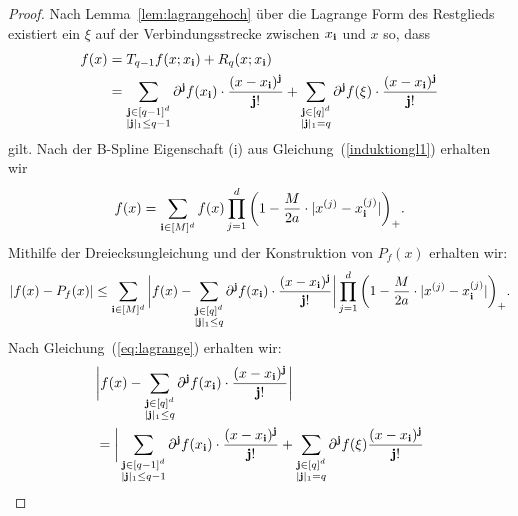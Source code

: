\begin{proof}
Nach Lemma~\ref{lem:lagrangehoch} über die Lagrange Form des Restglieds existiert ein $\xi$ auf der Verbindungsstrecke zwischen $x_{\mathbf{i}}$ und $x$ so, dass 
\begin{equation}
\label{eq:lagrange}
\begin{split}
f(x) & = T_{q - 1}f(x; x_{\mathbf{i}}) + R_q(x; x_{\mathbf{i}})\\
& = \sum_{\substack{\mathbf{j} \in [q - 1]^d \\ |\mathbf{j}|_1 \leq q - 1}}  \partial^{\mathbf{j}}f(x_{\mathbf{i}}) \cdot \frac{ (x - x_{\mathbf{i}})^{\mathbf{j}} }{\mathbf{j}!} + \sum_{\substack{ \mathbf{j} \in [q]^d \\|\mathbf{j}|_1 = q}} \partial^{\mathbf{j}}f(\xi) \cdot \frac{ (x - x_{\mathbf{i}})^{\mathbf{j}} }{\mathbf{j}!}
\end{split}
\end{equation}
gilt.
Nach der B-Spline Eigenschaft (i) aus Gleichung~(\ref{induktiongl1}) erhalten wir 
$$f(x) = \sum_{\mathbf{i} \in [M]^d} f(x) \prod_{j = 1}^d \bigg(1 - \frac{M}{2a} \cdot |x^{(j)} - x_{\mathbf{i}}^{(j)}|\bigg)_+.$$ 
Mithilfe der Dreiecksungleichung und der Konstruktion von $P_f(x)$ erhalten wir:
\begin{equation}
\label{eq:drei}
\begin{split}
|f(x) - P_f(x)| \leq \sum_{\mathbf{i} \in [M]^d} \bigg|f(x) - \sum_{\substack{\mathbf{j} \in [q]^d \\|\mathbf{j}|_1 \leq q}} \partial^{\mathbf{j}}f(x_{\mathbf{i}}) \cdot \frac{(x - x_{\mathbf{i}})^{\mathbf{j}}}{\mathbf{j}!}\bigg| \prod_{j = 1}^d \bigg(1 - \frac{M}{2a} \cdot |x^{(j)} - x_{\mathbf{i}}^{(j)}|\bigg)_+.
\end{split}
\end{equation}
Nach Gleichung~(\ref{eq:lagrange}) erhalten wir:
\begin{equation}
\label{eq:sum}
\begin{split}
& \bigg|f(x) - \sum_{\substack{\mathbf{j} \in [q]^d \\|\mathbf{j}|_1 \leq q}} \partial^{\mathbf{j}}f(x_{\mathbf{i}}) \cdot \frac{(x - x_{\mathbf{i}})^{\mathbf{j}}}{\mathbf{j}!}\bigg| \\ 
& = \bigg| \sum_{\substack{\bj \in [q - 1]^d \\ |\bj|_1 \leq q - 1}}  \partial^{\bj}f(x_{\mathbf{i}}) \cdot \frac{ (x - x_{\mathbf{i}})^{\bj} }{\bj!} + \sum_{\substack{ \bj \in [q]^d \\|\bj|_1 = q}} \partial^{\bj}f(\xi) \frac{ (x - x_{\mathbf{i}})^{\bj} }{\bj!} \\

\end{split}
\end{equation}
\end{proof}
